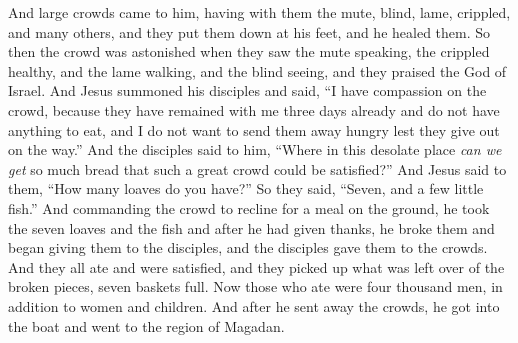 \begin{biblechapter}
\verse And large crowds came to him, having with them the mute, blind, lame, crippled, and many others, and they put them down at his feet, and he healed them.
\verse So then the crowd was astonished when they saw the mute speaking, the crippled healthy, and the lame walking, and the blind seeing, and they praised the God of Israel.
 And Jesus summoned his disciples and said, “I have compassion on the crowd, because they have remained with me three days already and do not have anything to eat, and I do not want to send them away hungry lest they give out on the way.”
\verse And the disciples said to him, “Where in this desolate place \textit{can we get} so much bread that such a great crowd could be satisfied?”
\verse And Jesus said to them, “How many loaves do you have?” So they said, “Seven, and a few little fish.”
\verse And commanding the crowd to recline for a meal on the ground,
\verse he took the seven loaves and the fish and after he had given thanks, he broke them and began giving them to the disciples, and the disciples gave them to the crowds.
\verse And they all ate and were satisfied, and they picked up what was left over of the broken pieces, seven baskets full.
\verse Now those who ate were four thousand men, in addition to women and children.
\verse And after he sent away the crowds, he got into the boat and went to the region of Magadan.
\end{biblechapter}

